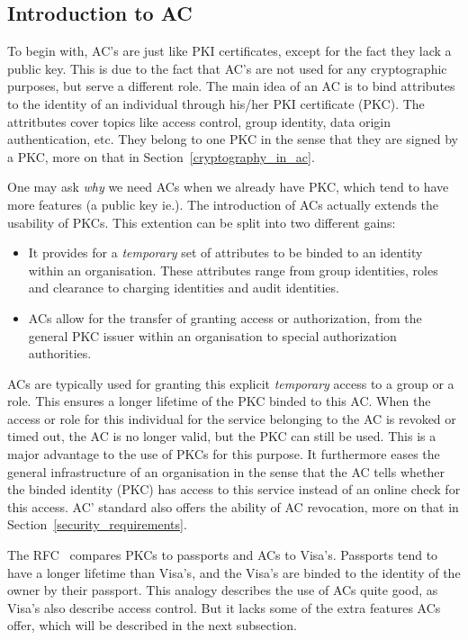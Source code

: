 \documentclass[10pt,conference,a4paper]{IEEEtran}
\begin{document}
\subsection{Introduction to AC}
To begin with, AC's are just like PKI certificates, except for the fact they lack a public key. This is due to the fact that AC's are not used for any cryptographic purposes, but serve a different role. The main idea of an AC is to bind attributes to the identity of an individual through his/her PKI certificate (PKC). The attritbutes cover topics like access control, group identity, data origin authentication, etc. They belong to one PKC in the sense that they are signed by a PKC, more on that in Section~\ref{cryptography_in_ac}.

One may ask \textit{why} we need ACs when we already have PKC, which tend to have more features (a public key ie.). The introduction of ACs actually extends the usability of PKCs. This extention can be split into two different gains:
\begin{itemize}
	\item It provides for a \textit{temporary} set of attributes to be binded to an identity within an organisation. These attributes range from group identities, roles and clearance to charging identities and audit identities. 
	\item ACs allow for the transfer of granting access or authorization, from the general PKC issuer within an organisation to special authorization authorities.
\end{itemize}

ACs are typically used for granting this explicit \textit{temporary} access to a group or a role. This ensures a longer lifetime of the PKC binded to this AC. When the access or role for this individual for the service belonging to the AC is revoked or timed out, the AC is no longer valid, but the PKC can still be used. This is a major advantage to the use of PKCs for this purpose. It furthermore eases the general infrastructure of an organisation in the sense that the AC tells whether the binded identity (PKC) has access to this service instead of an online check for this access. AC' standard also offers the ability of AC revocation, more on that in Section~\ref{security_requirements}.

The RFC~\cite{rfc_ac} compares PKCs to passports and ACs to Visa's. Passports tend to have a longer lifetime than Visa's, and the Visa's are binded to the identity of the owner by their passport. This analogy describes the use of ACs quite good, as Visa's also describe access control. But it lacks some of the extra features ACs offer, which will be described in the next subsection.
\end{document}

